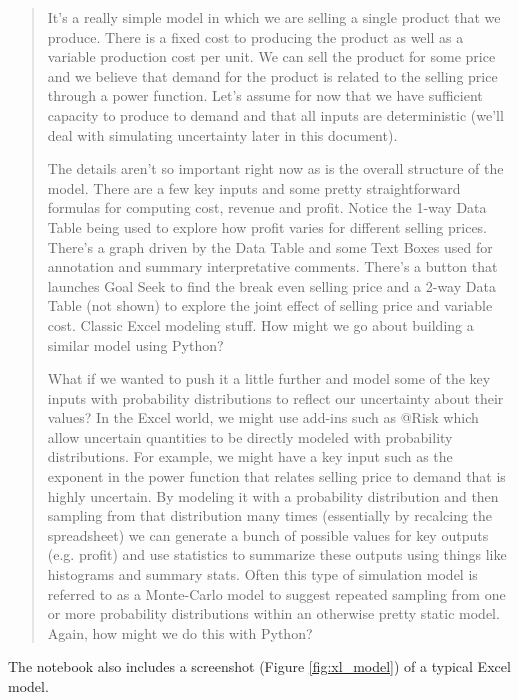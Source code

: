 \documentclass[ited,blindrev]{informs3}              %
\begin{document}
\begin{tcolorbox}[boxrule=1pt,sharp corners]
\begin{quotation}
\textsf{	
	It's a really simple model in which we are selling a single product that we produce. There is a fixed cost to producing the product as well as a variable production cost per unit. We can sell the product for some price and we believe that demand for the product is related to the selling price through a power function. Let's assume for now that we have sufficient capacity to produce to demand and that all inputs are deterministic (we'll deal with simulating uncertainty later in this document).}
	
	\textsf{The details aren't so important right now as is the overall structure of the model. There are a few key inputs and some pretty straightforward formulas for computing cost, revenue and profit. Notice the 1-way Data Table being used to explore how profit varies for different selling prices. There's a graph driven by the Data Table and some Text Boxes used for annotation and summary interpretative comments. There's a button that launches Goal Seek to find the break even selling price and a 2-way Data Table (not shown) to explore the joint effect of selling price and variable cost. Classic Excel modeling stuff. How might we go about building a similar model using Python? } 
	
	\textsf{What if we wanted to push it a little further and model some of the key inputs with probability distributions to reflect our uncertainty about their values? In the Excel world, we might use add-ins such as @Risk which allow uncertain quantities to be directly modeled with probability distributions. For example, we might have a key input such as the exponent in the power function that relates selling price to demand that is highly uncertain. By modeling it with a probability distribution and then sampling from that distribution many times (essentially by recalcing the spreadsheet) we can generate a bunch of possible values for key outputs (e.g. profit) and use statistics to summarize these outputs using things like histograms and summary stats. Often this type of simulation model is referred to as a Monte-Carlo model to suggest repeated sampling from one or more probability distributions within an otherwise pretty static model. Again, how might we do this with Python?}
\end{quotation}
\end{tcolorbox}

The notebook also includes a screenshot (Figure \ref{fig:xl_model}) of a typical Excel model.
\end{document}
